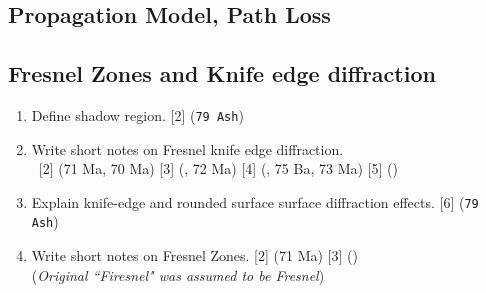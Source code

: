 \documentclass[12pt]{article}
\newcommand{\enter}{\\\textcolor{white}{1}}
\begin{document}
  \subsection{Propagation Model, Path Loss}
  \subsection{Fresnel Zones and Knife edge diffraction}
    \begin{enumerate}
      \item Define shadow region. \hfill [2] (\texttt{79 Ash})

      \item Write short notes on Fresnel knife edge diffraction.
        \enter \hfill [2] {\tiny (71 Ma, 70 Ma)} [3] {\tiny (, 72 Ma)} [4] {\tiny (, 75 Ba, 73 Ma)} [5] {\tiny ()}

      \item Explain knife-edge and rounded surface surface diffraction effects. \hfill [6] (\texttt{79 Ash})

      \item Write short notes on Fresnel Zones. \hfill [2] (71 Ma) [3] ()\\
        (\textit{Original ``Firesnel" was assumed to be Fresnel})
    \end{enumerate}
\end{document}
